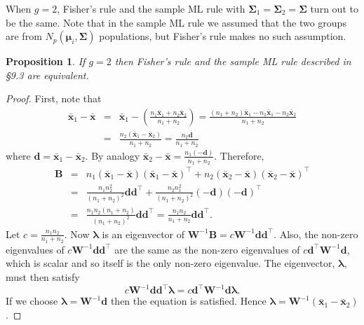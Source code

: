 \documentclass[]{book}
\newtheorem{proposition}{Proposition}[chapter]
\theoremstyle{definition}
\theoremstyle{definition}
\theoremstyle{definition}
\theoremstyle{remark}
\begin{document}
When \(g=2\), Fisher's rule and the sample ML rule with \(\boldsymbol \Sigma_1=\boldsymbol \Sigma_2=\boldsymbol \Sigma\) turn out to be the same. Note that in
the sample ML rule we assumed that the two groups are from \(N_p(\boldsymbol \mu_i, \boldsymbol \Sigma)\)
populations, but Fisher's rule makes no such assumption.

\begin{proposition}
\protect\hypertarget{prp:nine3}{}{\label{prp:nine3} }If \(g=2\) then Fisher's rule and the sample ML rule described in \S 9.3 are equivalent.
\end{proposition}

\begin{proof}
{}First, note that
\begin{eqnarray*}
\bar{\boldsymbol x}_1 - \bar{\boldsymbol x} &=& \bar{\boldsymbol x}_1 - \left(\frac{n_1 \bar{\boldsymbol x}_1 + n_2 \bar{\boldsymbol x}_2}{n_1+n_2} \right)
= \frac{ (n_1+n_2) \bar{\boldsymbol x}_1 - n_1 \bar{\boldsymbol x}_1 - n_2 \bar{\boldsymbol x}_2 }{n_1+n_2} \\
&=& \frac{ n_2 (\bar{\boldsymbol x}_1 - \bar{\boldsymbol x}_2) }{n_1 + n_2} = \frac{n_2 \boldsymbol d}{n_1+n_2}
\end{eqnarray*}
where \(\boldsymbol d= \bar{\boldsymbol x}_1 - \bar{\boldsymbol x}_2\). By analogy \(\bar{\boldsymbol x}_2 - \bar{\boldsymbol x} = \frac{n_1 (-\boldsymbol d)}{n_1+n_2}\). Therefore,
\begin{eqnarray*}
\boldsymbol B&=& n_1 (\bar{\boldsymbol x}_1 - \bar{\boldsymbol x})(\bar{\boldsymbol x}_1 - \bar{\boldsymbol x})^\top + n_2 (\bar{\boldsymbol x}_2 - \bar{\boldsymbol x})(\bar{\boldsymbol x}_2 - \bar{\boldsymbol x})^\top \\
&=& \frac{n_1 n_2^2}{(n_1+n_2)^2} \boldsymbol d\boldsymbol d^\top + \frac{n_2 n_1^2}{(n_1+n_2)^2} (-\boldsymbol d)(-\boldsymbol d)^\top \\
&=& \frac{n_1 n_2 (n_1 + n_2)}{(n_1+n_2)^2} \boldsymbol d\boldsymbol d^\top = \frac{n_1 n_2}{n_1+n_2} \boldsymbol d\boldsymbol d^\top.
\end{eqnarray*}
Let \(c = \frac{n_1 n_2}{n_1+n_2}\). Now \(\boldsymbol \lambda\) is an eigenvector of \(\boldsymbol W^{-1} \boldsymbol B= c \boldsymbol W^{-1} \boldsymbol d\boldsymbol d^\top\). Also, the non-zero eigenvalues of \(c \boldsymbol W^{-1} \boldsymbol d\boldsymbol d^\top\) are the same as the non-zero eigenvalues of \(c \boldsymbol d^\top \boldsymbol W^{-1} \boldsymbol d\), which is scalar and so itself is the only non-zero eigenvalue. The eigenvector, \(\boldsymbol \lambda\), must then satisfy
\[ c \boldsymbol W^{-1} \boldsymbol d\boldsymbol d^\top \boldsymbol \lambda= c \boldsymbol d^\top \boldsymbol W^{-1} \boldsymbol d\boldsymbol \lambda. \]
If we choose \(\boldsymbol \lambda= \boldsymbol W^{-1} \boldsymbol d\) then the equation is satisfied. Hence \(\boldsymbol \lambda= \boldsymbol W^{-1} (\bar{\boldsymbol x}_1 - \bar{\boldsymbol x}_2)\).


\end{proof}
\end{document}
